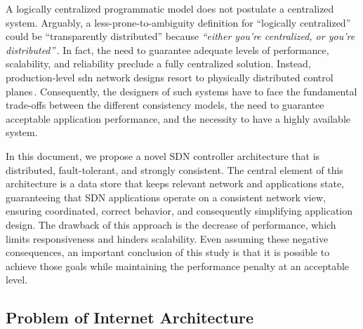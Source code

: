 A logically centralized programmatic model does not postulate a centralized system. Arguably, a less-prone-to-ambiguity definition for ``logically centralized'' could be ``transparently distributed'' because \emph{``either you're centralized, or you're distributed''}\,\cite{casado2011}.
In fact, the need to guarantee adequate levels of performance, scalability, and reliability preclude a fully centralized solution.
Instead, production-level \gls{sdn} network designs resort to physically distributed control planes\,\cite{Rao:2011vz,Lee:1996jm,Bolosky:2011ve,Wang:2012tj,jain2013b4}.
Consequently, the designers of such systems have to face the fundamental trade-offs between the different consistency models, the need to guarantee acceptable application performance, and the necessity to have a highly available system.


In this document, we propose a novel SDN controller architecture that is distributed, fault-tolerant, and strongly consistent.
The central element of this architecture is a data store that keeps relevant network and applications state, guaranteeing that SDN applications operate on a consistent network view, ensuring coordinated, correct behavior, and consequently simplifying application design. The drawback of  this approach  is the decrease of performance, which limits responsiveness and hinders scalability. Even assuming these negative consequences, an important conclusion of this study is that it is possible to achieve those goals while maintaining the performance penalty at an acceptable level.

\subsection{Problem of Internet Architecture}

